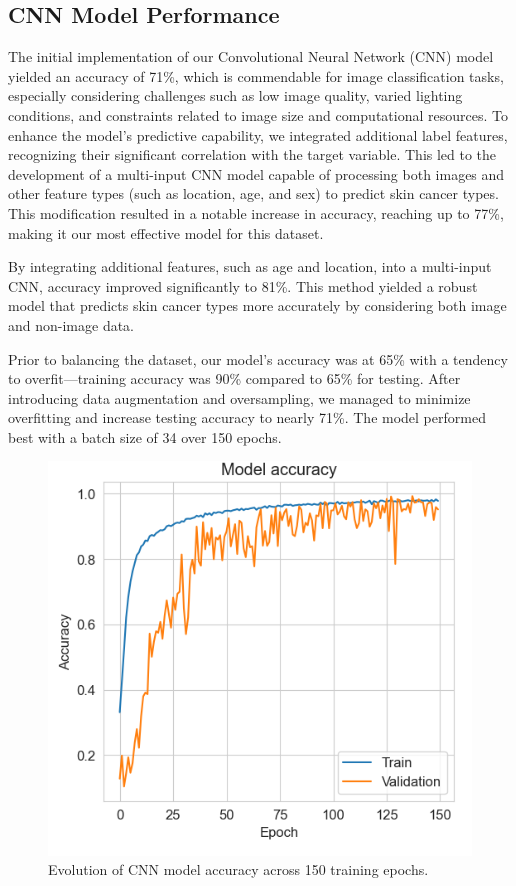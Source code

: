 \documentclass[conference]{IEEEtran}
\begin{document}
\subsection{CNN Model Performance}

The initial implementation of our Convolutional Neural Network (CNN) model yielded an accuracy of 71\%, which is commendable for image classification tasks, especially considering challenges such as low image quality, varied lighting conditions, and constraints related to image size and computational resources. To enhance the model's predictive capability, we integrated additional label features, recognizing their significant correlation with the target variable. This led to the development of a multi-input CNN model capable of processing both images and other feature types (such as location, age, and sex) to predict skin cancer types. This modification resulted in a notable increase in accuracy, reaching up to 77\%, making it our most effective model for this dataset.

By integrating additional features, such as age and location, into a multi-input CNN, accuracy improved significantly to 81\%. This method yielded a robust model that predicts skin cancer types more accurately by considering both image and non-image data.

Prior to balancing the dataset, our model's accuracy was at 65\% with a tendency to overfit—training accuracy was 90\% compared to 65\% for testing. After introducing data augmentation and oversampling, we managed to minimize overfitting and increase testing accuracy to nearly 71\%. The model performed best with a batch size of 34 over 150 epochs.
\begin{figure}[h]
    \centering
    \includegraphics[width=1\linewidth]{fig6.png}
    \caption{Evolution of CNN model accuracy across 150 training epochs.}
    \label{fig:fig1}
\end{figure}
\end{document}
